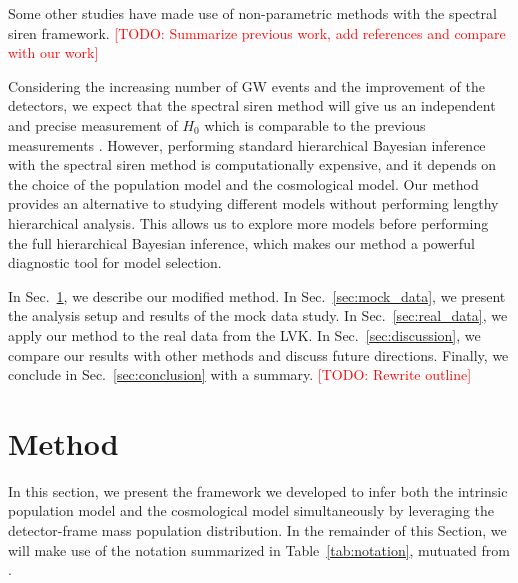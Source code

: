 \documentclass[twocolumn]{aastex631}
\newcommand{\todo}[1]{\textcolor{red}{[TODO: #1]}}
\begin{document}
Some other studies have made use of non-parametric methods with the spectral siren framework.
\todo{Summarize previous work, add references and compare with our work}

Considering the increasing number of \ac{GW} events and the improvement of the detectors, we expect that the spectral siren method will give us an independent and precise measurement of $H_0$ which is comparable to the previous measurements \citep{Planck:2018vyg, Riess:2021jrx}.
However, performing standard hierarchical Bayesian inference with the spectral siren method is computationally expensive, and it depends on the choice of the population model and the cosmological model.
Our method provides an alternative to studying different models without performing lengthy hierarchical analysis.
This allows us to explore more models before performing the full hierarchical Bayesian inference, which makes our method a powerful diagnostic tool for model selection.

In Sec.~\ref{sec:method}, we describe our modified method.
In Sec.~\ref{sec:mock_data}, we present the analysis setup and results of the mock data study.
In Sec.~\ref{sec:real_data}, we apply our method to the real data from the \ac{LVK}.
In Sec.~\ref{sec:discussion}, we compare our results with other methods and discuss future directions.
Finally, we conclude in Sec.~\ref{sec:conclusion} with a summary.
\todo{Rewrite outline}

\section{Method}
\label{sec:method}
In this section, we present the framework we developed to infer both the intrinsic population model and the cosmological model simultaneously by leveraging the detector-frame mass population distribution.
In the remainder of this Section, we will make use of the notation summarized in Table~\ref{tab:notation}, mutuated from \citet{Rinaldi:2021bhm, Rinaldi:2022kyg}.
\end{document}
